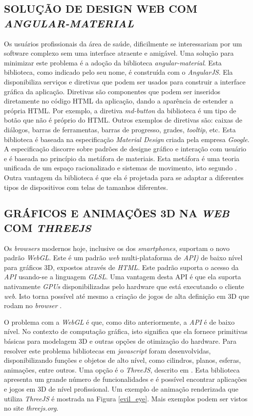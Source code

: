 \subsection{SOLUÇÃO DE DESIGN WEB COM \emph{ANGULAR-MATERIAL}}
\label{angular_material}

Os usuários profissionais da área de saúde, dificilmente se interessariam por um software complexo sem uma interface atraente e amigável.
Uma solução para minimizar este problema é a adoção da  biblioteca \emph{angular-material}. 
Esta biblioteca, como indicado pelo seu nome, é construída com o \emph{AngularJS}. 
Ela disponibiliza serviços e diretivas que podem ser usados para construir a interface gráfica da aplicação. 
Diretivas são componentes que podem ser inseridos diretamente no código HTML da aplicação, dando a aparência de estender a própria HTML. 
Por exemplo, a diretiva \emph{md-button} da biblioteca é um tipo de botão que não é próprio do HTML. 
Outros exemplos de diretivas são: caixas de diálogos, barras de ferramentas, barras de progresso, grades, \emph{tooltip}, etc. 
Esta biblioteca é baseada na especificação \emph{Material Design} criada pela empresa \emph{Google}. 
A especificação discorre sobre padrões de designe gráfico e interação com usuário e é baseada no princípio da metáfora de materiais. 
Esta metáfora é uma teoria unificada de um espaço racionalizado e sistemas de movimento, isto segundo . Outra vantagem da biblioteca é que ela é projetada para se adaptar a diferentes tipos de dispositivos com telas de tamanhos diferentes.


\subsection{GRÁFICOS E ANIMAÇÕES 3D NA \emph{WEB} COM \emph{THREEJS}} 
Os \emph{browsers} modernos hoje, inclusive os dos \emph{smartphones}, suportam o novo padrão \emph{WebGL}. 
Este é um padrão \emph{web} multi-plataforma de \emph{API)} de baixo nível para gráficos 3D, expostos através de \emph{HTML}. 
Este padrão suporta o acesso da \emph{API} usando-se a linguagem \emph{GLSL}. 
Uma vantagem desta API é que ela suporta nativamente \emph{GPUs} disponibilizadas pelo hardware que está executando o cliente \emph{web}. 
Isto torna possível até mesmo a criação de jogos de alta definição em 3D que rodam no \emph{browser} \cite{Matsuda2013}.

O problema com a \emph{WebGL} é que, como dito anteriormente, a \emph{API} é de baixo nível. 
No contexto de computação gráfica, isto significa que ela fornece primitivas básicas para modelagem 3D e outras opções de otimização do hardware.
Para resolver este problema bibliotecas em \emph{javascript} foram desenvolvidas, disponibilizando funções e objetos de alto nível, como cilindros, planos, esferas, animações, entre outros. 
Uma opção é o \emph{ThreeJS}, descrito em . 
Esta biblioteca apresenta um grande número de funcionalidades e é possível encontrar aplicações e jogos em 3D de nível profissional. 
Um exemplo de animação renderizada que utiliza \emph{ThreeJS} é mostrada na Figura \ref{evil_eye}.
Mais exemplos podem ser vistos no site \emph{threejs.org}.

